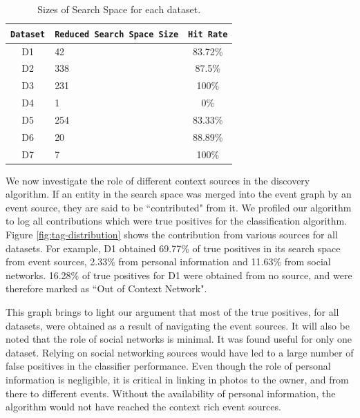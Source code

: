 \begin{table}[h]
\begin{center}
\begin{tabular}{ |c|p{2.5cm}|c| }
  \hline
  \texttt{Dataset} & \texttt{Reduced Search Space Size} & \texttt{Hit Rate}\\
  \hline
  D1 & 42 & 83.72\%\\
  D2 & 338 & 87.5\%\\
  D3 & 231 & 100\%\\
  D4 & 1 & 0\%\\
  D5 & 254 & 83.33\%\\
  D6 & 20 & 88.89\%\\
  D7 & 7 & 100\%\\
  \hline
\end{tabular}
\caption{Sizes of Search Space for each dataset.}
\label{tbl:search-spaces}
\end{center}
\end{table}

We now investigate the role of different context sources in the discovery algorithm. If an entity in the search space was merged into the event graph by an event source, they are said to be ``contributed" from it. We profiled our algorithm to log all contributions which were true positives for the classification algorithm. Figure \ref{fig:tag-distribution} shows the contribution from various sources for all datasets. For example, D1 obtained 69.77\% of true positives in its search space from event sources, 2.33\% from personal information and 11.63\% from social networks. 16.28\% of true positives for D1 were obtained from no source, and were therefore marked as ``Out of Context Network". 

This graph brings to light our argument that most of the true positives, for all datasets, were obtained as a result of navigating the event sources. It will also be noted that the role of social networks is minimal. It was found useful for only one dataset. Relying on social networking sources would have led to a large number of false positives in the classifier performance. Even though the role of personal information is negligible, it is critical in linking in photos to the owner, and from there to different events. Without the availability of personal information, the algorithm would not have reached the context rich event sources.


